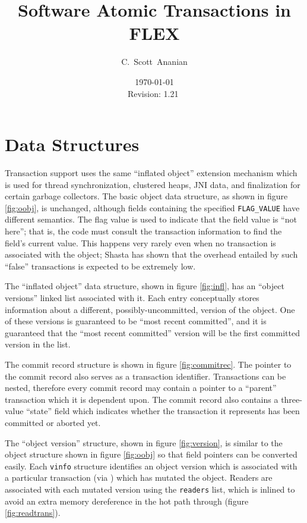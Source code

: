 \documentclass[11pt,notitlepage]{article}
\author{C.~Scott~Ananian}
\title{Software Atomic Transactions in FLEX}
\date{\today \\ $ $Revision: 1.21 $ $}
\begin{document}

\maketitle
\section{Data Structures}

Transaction support uses the same ``inflated object'' extension
mechanism which is used for thread synchronization, clustered heaps,
JNI data, and finalization for certain garbage collectors.
The basic object data structure, as shown in figure \ref{fig:oobj}, is
unchanged, although fields containing the specified
\texttt{FLAG\_VALUE} have different semantics.  The flag value is used
to indicate that the field value is ``not here''; that is, the code
must consult the transaction information to find the field's current
value.  This happens very rarely even when no transaction is
associated with the object; Shasta \cite{scales96:shasta} has shown that the
overhead entailed by such ``false'' transactions is expected to be
extremely low.

The ``inflated object'' data structure, shown in figure
\ref{fig:infl}, has an ``object versions'' linked list associated with
it.  Each entry conceptually stores information about a different,
possibly-uncommitted, version of the object.  One of these versions is
guaranteed to be ``most recent committed'', and it is guaranteed that
the ``most recent committed'' version will be the first committed
version in the list.

The commit record structure is shown in figure \ref{fig:commitrec}.
The pointer to the commit record also serves as a transaction
identifier.  Transactions can be nested, therefore every commit record
may contain a pointer to a ``parent'' transaction which it is
dependent upon.  The commit record also contains a three-value
``state'' field which indicates whether the transaction it represents
has been committed or aborted yet.

The ``object version'' structure, shown in figure
\ref{fig:version}, is similar to the object structure shown in
figure \ref{fig:oobj} so that field pointers can be converted easily.
Each \texttt{vinfo} structure identifies an object version which is
associated with a particular transaction (via ) which
has mutated the object.  Readers are associated with each mutated
version using the \texttt{readers} list, which is inlined to avoid an
extra memory dereference in the hot path through 
(figure \ref{fig:readtrans}).
\end{document}
